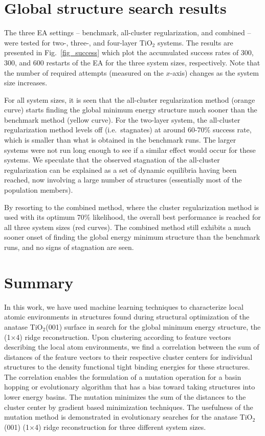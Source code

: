 \documentclass[aip,amsmath,amssymb,reprint]{revtex4-1}
\begin{document}
\section{Global structure search results}


The three EA settings -- benchmark, all-cluster regularization, and
combined -- were tested for two-, three-, and four-layer TiO$_2$
systems. The results are presented in Fig.\  \ref{fig_success} which
plot the accumulated success rates of 300, 300, and 600 restarts of the EA for the three system sizes, respectively. Note that
the number of required attempts (measured on the $x$-axis) changes as
the system size increases.

For all system sizes, it is seen that the all-cluster regularization
method (orange curve) starts finding the global minimum energy
structure much sooner than the benchmark method (yellow curve). For the two-layer system,
the all-cluster regularization method levels off (i.e.\ stagnates) at around 60-70\%
success rate, which is smaller than what is obtained in the benchmark
runs. The larger systems were not run long enough to see if a similar
effect would occur for these systems. We speculate that the observed
stagnation of the all-cluster regularization can be explained as a set
of dynamic equilibria having been reached, now involving a large
number of structures (essentially most of the population members).

By resorting to the combined method, where the cluster regularization
method is used with its optimum 70\% likelihood, the overall best
performance is reached for all three system sizes (red curves). The
combined method still exhibits a much sooner onset of finding the global energy
minimum structure than the benchmark runs, and no signs of stagnation are seen.


\section{Summary}
In this work, we have used machine learning techniques to characterize
local atomic environments in structures found during structural
optimization of the anatase TiO$_2$(001) surface in search for the
global minimum energy structure, the (1$\times$4) ridge
reconstruction. Upon clustering according to feature vectors
describing the local atom environments, we find a correlation between
the sum of distances of the feature vectors to their respective
cluster centers for individual structures to the density functional
tight binding energies for these structures. The correlation enables
the formulation of a mutation operation for a basin hopping or
evolutionary algorithm that has a bias toward taking structures
into lower energy basins. The mutation minimizes the sum of the
distances to the cluster center by gradient based minimization
techniques. The usefulness of the mutation method is demonstrated in
evolutionary searches for the anatase TiO$_2$(001) (1$\times$4) ridge
reconstruction for three different system sizes.
\end{document}

